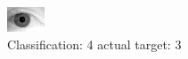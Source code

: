 \begin{figure}[h!]
\begin{center}
\includegraphics[width=0.60\columnwidth]{figures/ID2095_class_4_target_3.png}
\end{center}
\caption{ Classification: 4 actual target: 3}
\label{fig:ID2095_class_4_target_3}
\end{figure}
